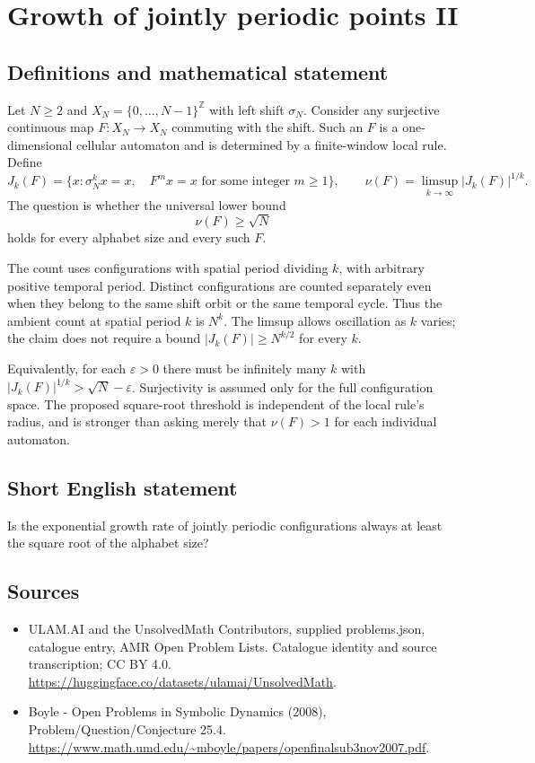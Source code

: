 \documentclass[11pt,a4paper]{article}
\begin{document}
\section*{Growth of jointly periodic points II}\label{statement}

\subsection{Definitions and mathematical statement}
Let $N\ge2$ and $X_N=\{0,\ldots,N-1\}^{\mathbb Z}$ with
left shift $\sigma_N$. Consider any surjective continuous map
$F:X_N\to X_N$ commuting with the shift. Such an $F$ is a
one-dimensional cellular automaton and is determined by a
finite-window local rule. Define
\[
 J_k(F)=\{x:\sigma_N^k x=x,\quad
                   F^m x=x\text{ for some integer }m\ge1\},
 \qquad \nu(F)=\limsup_{k\to\infty}|J_k(F)|^{1/k}.
\]
The question is whether the universal lower bound
\[
                           \nu(F)\ge\sqrt N
\]
holds for every alphabet size and every such $F$.

The count uses configurations with spatial period dividing $k$,
with arbitrary positive temporal period. Distinct configurations
are counted separately even when they belong to the same shift
orbit or the same temporal cycle. Thus the ambient count at
spatial period $k$ is $N^k$. The limsup allows oscillation as
$k$ varies; the claim does not require a bound
$|J_k(F)|\ge N^{k/2}$ for every $k$.

Equivalently, for each $\varepsilon>0$ there must be infinitely
many $k$ with $|J_k(F)|^{1/k}>\sqrt N-\varepsilon$.
Surjectivity is assumed only for the full configuration space.
The proposed square-root threshold is independent of the local
rule's radius, and is stronger than asking merely that
$\nu(F)>1$ for each individual automaton.
\subsection{Short English statement}
Is the exponential growth rate of jointly periodic configurations always at least the square root of the alphabet size?
\subsection{Sources}
\begin{itemize}
\item[S1] ULAM.AI and the UnsolvedMath Contributors, supplied problems.json, catalogue entry, AMR Open Problem Lists. Catalogue identity and source transcription; CC BY 4.0.
\url{https://huggingface.co/datasets/ulamai/UnsolvedMath}.
\item[S2] Boyle - Open Problems in Symbolic Dynamics (2008), Problem/Question/Conjecture 25.4. 
\url{https://www.math.umd.edu/~mboyle/papers/openfinalsub3nov2007.pdf}.
\end{itemize}
\end{document}
